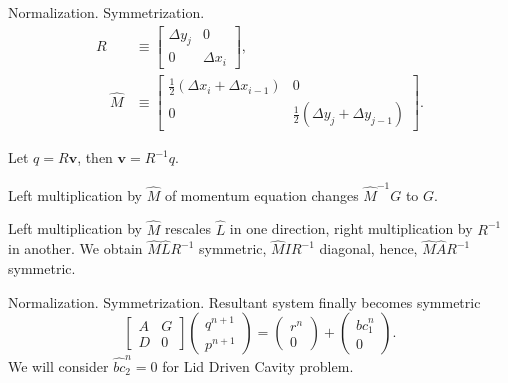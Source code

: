 \documentclass{beamer}
\begin{document}
	

	
	\begin{frame}{Normalization. Symmetrization.}
	\begin{align*}
	R &\equiv\left[\begin{array}{cc}
	\Delta y_j & 0 \\
	0 & \Delta x_i
	\end{array}\right], \\
	\quad \hat{M} & \equiv\left[\begin{array}{cc}
	\frac{1}{2}\left(\Delta x_i+\Delta x_{i-1}\right) & 0 \\
	0 & \frac{1}{2}\left(\Delta y_j+\Delta y_{j-1}\right)
	\end{array}\right].
	\end{align*}
	
	Let $q=R\boldsymbol{v}$, then $\boldsymbol{v}=R^{-1}q$. 
	
	Left multiplication by $\hat{M}$ of momentum equation changes $\hat{M}^{-1}G$ to $G$.
	
	Left multiplication by $\hat{M}$ rescales $\hat{L}$ in one direction, right multiplication by $R^{-1}$ in another. We obtain $\hat{M}\hat{L}R^{-1}$ symmetric, $\hat{M}IR^{-1}$ diagonal, hence, $\hat{M}\hat{A}R^{-1}$ symmetric.
	\end{frame}
	
	\begin{frame}{Normalization. Symmetrization.}
	Resultant system finally becomes symmetric
		\begin{equation}\label{eqn:NSE-dsm-bl-system-nonint}
		\boxed{\begin{bmatrix}
			{A} & {G} \\
			{D} & 0
		\end{bmatrix}
		\begin{pmatrix}
			q^{n+1} \\ 
			p^{n+1}
		\end{pmatrix}
		=
		\begin{pmatrix}
			{r}^n \\
			0
		\end{pmatrix}
		+
		\begin{pmatrix}
			{bc}_1^n\\
			0
		\end{pmatrix}.}
		\end{equation}
		We will consider $\hat{bc}_2^n=0$ for Lid Driven Cavity problem. 
	\end{frame}
\end{document}
